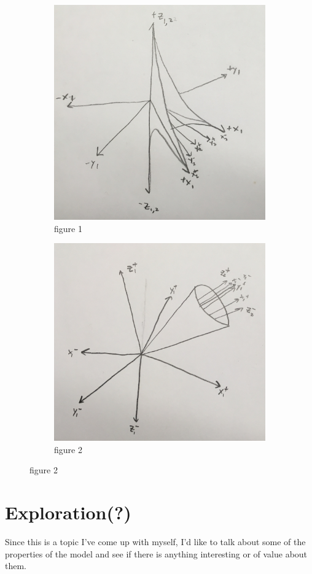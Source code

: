 \documentclass[20pt]{article} %
\begin{document}
\begin{figure}[h]
\centering
\begin{subfigure}{.5\textwidth}
  \centering
  \includegraphics[width=.6\linewidth]{./figures/fig1.jpg}
  \caption{figure 1}
  \label{fig:sub1}
\end{subfigure}%
\begin{subfigure}{.5\textwidth}
  \centering
  \includegraphics[width=.6\linewidth]{./figures/fig2.jpg}
  \caption{figure 2}
  \label{fig:sub2}
\end{subfigure}
\label{fig:test}
\end{figure}

\section{Exploration(?)}
Since this is a topic I've come up with myself, I'd like to talk about some of the properties of the model and see if there is anything interesting or of value about them.\\
\end{document}
